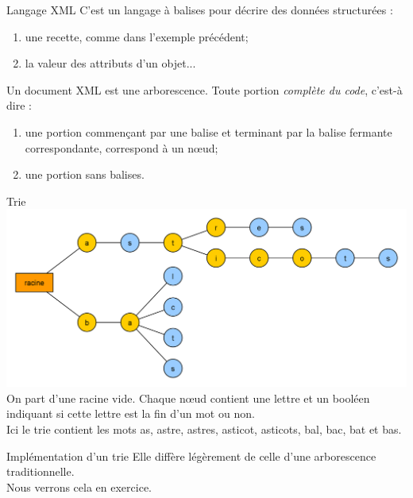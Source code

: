 \documentclass[10pt]{beamer}
\begin{document}
\begin{frame}{Langage XML}
C'est un langage à balises pour décrire des données structurées :
\begin{enumerate}[--]
	\item 	une recette, comme dans l'exemple précédent;
	\item 	la valeur des attributs d'un objet...
\end{enumerate}
Un document XML est une arborescence. Toute portion \textit{complète du code}, c'est-à dire :
\begin{enumerate}[--]
	\item 	une portion commençant par une balise et terminant par la balise fermante correspondante, correspond à un n\oe ud;
	\item 	une portion sans balises.
\end{enumerate} 
\end{frame}
\begin{frame}{Trie}
\includegraphics[width=\linewidth]{img/trie}
On part d'une racine \og vide\fg{}. Chaque n\oe ud contient une lettre et un booléen indiquant si cette lettre est la fin d'un mot ou non.\\
Ici le trie contient les mots as, astre, astres, asticot, asticots, bal, bac, bat et bas.
\end{frame}
\begin{frame}{Implémentation d'un trie}
Elle diffère légèrement de celle d'une arborescence traditionnelle.\\

Nous verrons cela en exercice.
\end{frame}
\end{document}
